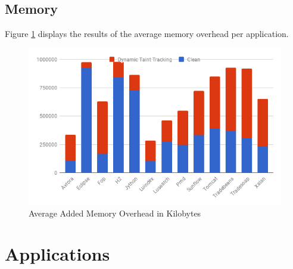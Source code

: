 \subsection{Memory}
Figure \ref{fig:Memory} displays the results of the average memory overhead per application.


\begin{figure}[!h]
	\centering
	\includegraphics[width=\textwidth]{images/Memory.png}
	\caption{Average Added Memory Overhead in Kilobytes}
	\label{fig:Memory}
\end{figure}


\section{Applications}
\begin{table}[!h]
  \centering
  \caption{Stanford SecuriBench Micro}
  \label{table:MicroTable}
\end{table}


